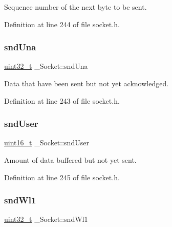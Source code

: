 Sequence number of the next byte to be sent. 



Definition at line 244 of file socket.\+h.

\mbox{\label{struct__Socket_a9bc2b30832c4f895ce58f5045353c710}} 
\subsubsection{\texorpdfstring{snd\+Una}{sndUna}}
{\footnotesize\ttfamily \hyperlink{stdint_8h_a435d1572bf3f880d55459d9805097f62}{uint32\+\_\+t} \+\_\+\+Socket\+::snd\+Una}



Data that have been sent but not yet acknowledged. 



Definition at line 243 of file socket.\+h.

\mbox{\label{struct__Socket_a06881f181115eff4f6d6739ae42c43bd}} 
\subsubsection{\texorpdfstring{snd\+User}{sndUser}}
{\footnotesize\ttfamily \hyperlink{stdint_8h_a273cf69d639a59973b6019625df33e30}{uint16\+\_\+t} \+\_\+\+Socket\+::snd\+User}



Amount of data buffered but not yet sent. 



Definition at line 245 of file socket.\+h.

\mbox{\label{struct__Socket_a4bd384572248e908c3cc7156f2780180}} 
\subsubsection{\texorpdfstring{snd\+Wl1}{sndWl1}}
{\footnotesize\ttfamily \hyperlink{stdint_8h_a435d1572bf3f880d55459d9805097f62}{uint32\+\_\+t} \+\_\+\+Socket\+::snd\+Wl1}



